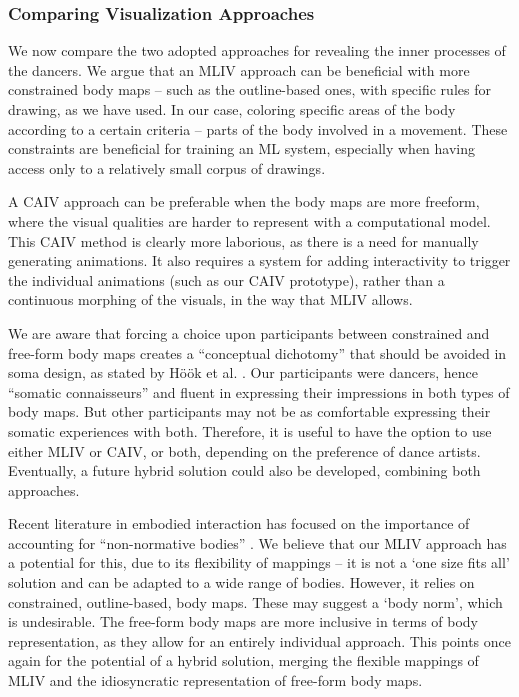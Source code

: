 \subsubsection{Comparing Visualization Approaches}

We now compare the two adopted approaches for revealing the inner processes of the dancers. We argue that an MLIV approach can be beneficial with more constrained body maps – such as the outline-based ones, with specific rules for drawing, as we have used. In our case, coloring specific areas of the body according to a certain criteria – parts of the body involved in a movement. These constraints are beneficial for training an ML system, especially when having access only to a relatively small corpus of drawings.

A CAIV approach can be preferable when the body maps are more freeform, where the visual qualities are harder to represent with a computational model. This CAIV method is clearly more laborious, as there is a need for manually generating animations. It also requires a system for adding interactivity to trigger the individual animations (such as our CAIV prototype), rather than a continuous morphing of the visuals, in the way that MLIV allows.

We are aware that forcing a choice upon participants between constrained and free-form body maps creates a “conceptual dichotomy” that should be avoided in soma design, as stated by Höök et al. \cite{hook_soma_2019}. Our participants were dancers, hence “somatic connaisseurs” \cite{schiphorst_self-evidence_2011} and fluent in expressing their impressions in both types of body maps. But other participants may not be as comfortable expressing their somatic experiences with both. Therefore, it is useful to have the option to use either MLIV or CAIV, or both, depending on the preference of dance artists. Eventually, a future hybrid solution could also be developed, combining both approaches.

Recent literature in embodied interaction has focused on the importance of accounting for “non-normative bodies” \cite{spiel_bodies_2021}. We believe that our MLIV approach has a potential for this, due to its flexibility of mappings – it is not a ‘one size fits all’ solution and can be adapted to a wide range of bodies. However, it relies on constrained, outline-based, body maps. These may suggest a ‘body norm’, which is undesirable. The free-form body maps are more inclusive in terms of body representation, as they allow for an entirely individual approach. This points once again for the potential of a hybrid solution, merging the flexible mappings of MLIV and the idiosyncratic representation of free-form body maps.

